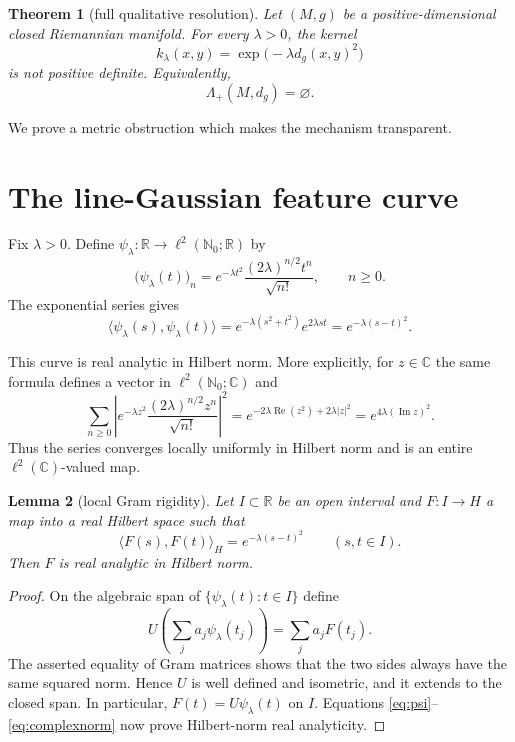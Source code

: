 \documentclass[11pt]{article}
\newtheorem{theorem}{Theorem}
\newtheorem{lemma}[theorem]{Lemma}
\theoremstyle{remark}
\newcommand{\R}{\mathbb R}
\newcommand{\N}{\mathbb N}
\begin{document}
\begin{theorem}[full qualitative resolution]\label{thm:main}
Let $(M,g)$ be a positive-dimensional closed Riemannian manifold.  For every
$\lambda>0$, the kernel
\[
 k_\lambda(x,y)=\exp\!\bigl(-\lambda d_g(x,y)^2\bigr)
\]
is not positive definite.  Equivalently,
\[
 \boxed{\Lambda_+(M,d_g)=\varnothing.}
\]
\end{theorem}

We prove a metric obstruction which makes the mechanism transparent.

\section{The line-Gaussian feature curve}

Fix $\lambda>0$.  Define $\psi_\lambda:\R\to\ell^2(\N_0;\R)$ by
\begin{equation}\label{eq:psi}
 \bigl(\psi_\lambda(t)\bigr)_n
 =e^{-\lambda t^2}\frac{(2\lambda)^{n/2}t^n}{\sqrt{n!}},
 \qquad n\geq0.
\end{equation}
The exponential series gives
\begin{equation}\label{eq:gram}
 \langle\psi_\lambda(s),\psi_\lambda(t)\rangle
 =e^{-\lambda(s^2+t^2)}e^{2\lambda st}
 =e^{-\lambda(s-t)^2}.
\end{equation}

This curve is real analytic in Hilbert norm.  More explicitly, for $z\in
\mathbb C$ the same formula defines a vector in $\ell^2(\N_0;\mathbb C)$ and
\begin{equation}\label{eq:complexnorm}
 \sum_{n\geq0}\left|e^{-\lambda z^2}
 \frac{(2\lambda)^{n/2}z^n}{\sqrt{n!}}\right|^2
 =e^{-2\lambda\operatorname{Re}(z^2)+2\lambda|z|^2}
 =e^{4\lambda(\operatorname{Im}z)^2}.
\end{equation}
Thus the series converges locally uniformly in Hilbert norm and is an entire
$\ell^2(\mathbb C)$-valued map.

\begin{lemma}[local Gram rigidity]\label{lem:analytic}
Let $I\subset\R$ be an open interval and $F:I\to H$ a map into a real Hilbert
space such that
\[
 \langle F(s),F(t)\rangle_H=e^{-\lambda(s-t)^2}
 \qquad(s,t\in I).
\]
Then $F$ is real analytic in Hilbert norm.
\end{lemma}

\begin{proof}
On the algebraic span of $\{\psi_\lambda(t):t\in I\}$ define
\[
 U\!\left(\sum_j a_j\psi_\lambda(t_j)\right)=\sum_j a_jF(t_j).
\]
The asserted equality of Gram matrices shows that the two sides always have
the same squared norm.  Hence $U$ is well defined and isometric, and it
extends to the closed span.  In particular,
$F(t)=U\psi_\lambda(t)$ on $I$.  Equations \eqref{eq:psi}--\eqref{eq:complexnorm}
now prove Hilbert-norm real analyticity.
\end{proof}
\end{document}
